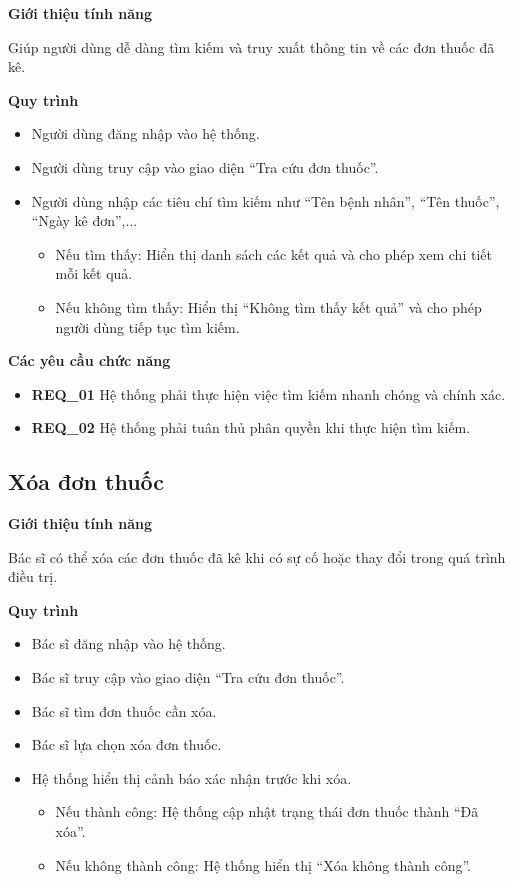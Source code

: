 \noindent \textbf{Giới thiệu tính năng}

Giúp người dùng dễ dàng tìm kiếm và truy xuất thông tin về các đơn thuốc đã kê.

\noindent \textbf{Quy trình}
\begin{itemize}
  \item Người dùng đăng nhập vào hệ thống.
  \item Người dùng truy cập vào giao diện ``Tra cứu đơn thuốc''.
  \item Người dùng nhập các tiêu chí tìm kiếm như ``Tên bệnh nhân'', ``Tên thuốc'', ``Ngày kê đơn'',...
    \begin{itemize}
      \item Nếu tìm thấy: Hiển thị danh sách các kết quả và cho phép xem chi tiết mỗi kết quả.
      \item Nếu không tìm thấy: Hiển thị ``Không tìm thấy kết quả'' và cho phép người dùng tiếp tục tìm kiếm.
    \end{itemize}
\end{itemize}

\noindent \textbf{Các yêu cầu chức năng}
\begin{itemize}
  \item \textbf{REQ\_01} Hệ thống phải thực hiện việc tìm kiếm nhanh chóng và chính xác.
  \item \textbf{REQ\_02} Hệ thống phải tuân thủ phân quyền khi thực hiện tìm kiếm.
\end{itemize}

\subsection{Xóa đơn thuốc}

\noindent \textbf{Giới thiệu tính năng}

Bác sĩ có thể xóa các đơn thuốc đã kê khi có sự cố hoặc thay đổi trong quá trình điều trị.

\noindent \textbf{Quy trình}
\begin{itemize}
  \item Bác sĩ đăng nhập vào hệ thống.
  \item Bác sĩ truy cập vào giao diện ``Tra cứu đơn thuốc''.
  \item Bác sĩ tìm đơn thuốc cần xóa.
  \item Bác sĩ lựa chọn xóa đơn thuốc.
  \item Hệ thống hiển thị cảnh báo xác nhận trước khi xóa.
    \begin{itemize}
      \item Nếu thành công: Hệ thống cập nhật trạng thái đơn thuốc thành ``Đã xóa''.
      \item Nếu không thành công: Hệ thống hiển thị ``Xóa không thành công''.
    \end{itemize}
\end{itemize}

